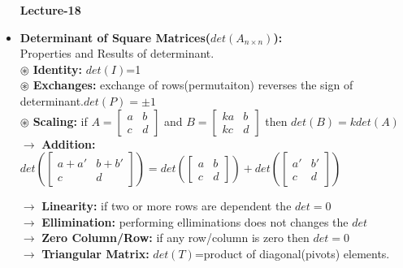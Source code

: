 \documentclass[a4paper,11pt]{article}
\numberwithin{equation}{section}
\begin{document}
\begin{itemize}
\begin{center}
    \Huge{\textbf{Lecture-18}}
\end{center}
\vspace{5pt}

\item \textbf{Determinant of Square Matrices($det(A_{n\times n})$): }\\
Properties and Results of determinant.\\

$\circledast$ \textbf{Identity: } $det(I)$=1\\

$\circledast$ \textbf{Exchanges: }exchange of rows(permutaiton) reverses the sign of determinant.$det(P)=\pm 1$\\

$\circledast$ \textbf{Scaling: }if $A=\begin{bmatrix} a&b\\c&d \end{bmatrix}$ and $B=\begin{bmatrix} ka&b\\kc&d \end{bmatrix}$ then $det(B)=kdet(A)$\\

$\rightarrow$ \textbf{Addition: } $det\left(\begin{bmatrix}
    a+a\prime&b+b \prime\\c&d
\end{bmatrix} \right)=det\left(\begin{bmatrix}
    a&b\\c&d
\end{bmatrix} \right)+det\left(\begin{bmatrix}
    a\prime&b \prime\\c&d
\end{bmatrix} \right)$

$\rightarrow$ \textbf{Linearity: }if two or more rows are dependent the $det=0$\\

$\rightarrow$ \textbf{Ellimination: }performing elliminations does not 
changes the $det$\\

$\rightarrow$ \textbf{Zero Column/Row: }if any row/column is zero then $det=0$\\

$\rightarrow$ \textbf{Triangular Matrix: }$det(T)$=product of diagonal(pivots) elements.\\


\end{itemize}
\end{document}
